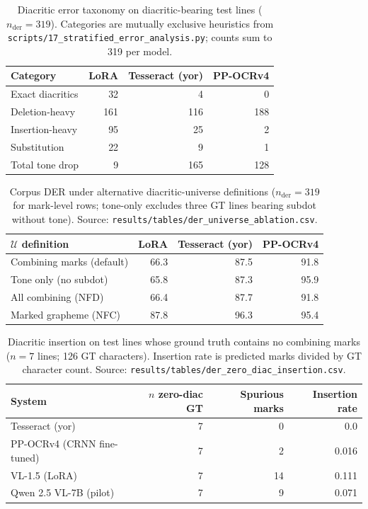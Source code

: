 \documentclass{article}
\begin{document}
\begin{table}[t]
  \centering
  \small
  \begin{tabular}{lrrr}
    \toprule
    Category & LoRA & Tesseract (yor) & PP-OCRv4 \\
    \midrule
    Exact diacritics & 32 & 4 & 0 \\
    Deletion-heavy & 161 & 116 & 188 \\
    Insertion-heavy & 95 & 25 & 2 \\
    Substitution & 22 & 9 & 1 \\
    Total tone drop & 9 & 165 & 128 \\
    \bottomrule
  \end{tabular}
  \caption{Diacritic error taxonomy on diacritic-bearing test lines ($n_{\mathrm{der}}{=}319$). Categories are mutually exclusive heuristics from \texttt{scripts/17\_stratified\_error\_analysis.py}; counts sum to 319 per model.}
  \label{tab:taxonomy}
\end{table}

\begin{table}[t]
  \centering
  \small
  \begin{tabular}{lrrr}
    \toprule
    $\mathcal{U}$ definition & LoRA & Tesseract (yor) & PP-OCRv4 \\
    \midrule
    Combining marks (default) & 66.3 & 87.5 & 91.8 \\
    Tone only (no subdot) & 65.8 & 87.3 & 95.9 \\
    All combining (NFD) & 66.4 & 87.7 & 91.8 \\
    Marked grapheme (NFC) & 87.8 & 96.3 & 95.4 \\
    \bottomrule
  \end{tabular}
  \caption{Corpus DER under alternative diacritic-universe definitions ($n_{\mathrm{der}}{=}319$ for mark-level rows; tone-only excludes three GT lines bearing subdot without tone). Source: \texttt{results/tables/der\_universe\_ablation.csv}.}
  \label{tab:der_universe}
\end{table}

\begin{table}[t]
  \centering
  \small
  \begin{tabular}{lrrr}
    \toprule
    System & $n$ zero-diac GT & Spurious marks & Insertion rate \\
    \midrule
    Tesseract (yor) & 7 & 0 & 0.0 \\
    PP-OCRv4 (CRNN fine-tuned) & 7 & 2 & 0.016 \\
    VL-1.5 (LoRA) & 7 & 14 & 0.111 \\
    Qwen 2.5 VL-7B (pilot) & 7 & 9 & 0.071 \\
    \bottomrule
  \end{tabular}
  \caption{Diacritic insertion on test lines whose ground truth contains no combining marks ($n{=}7$ lines; 126 GT characters). Insertion rate is predicted marks divided by GT character count. Source: \texttt{results/tables/der\_zero\_diac\_insertion.csv}.}
  \label{tab:der_insertion}
\end{table}
\end{document}
